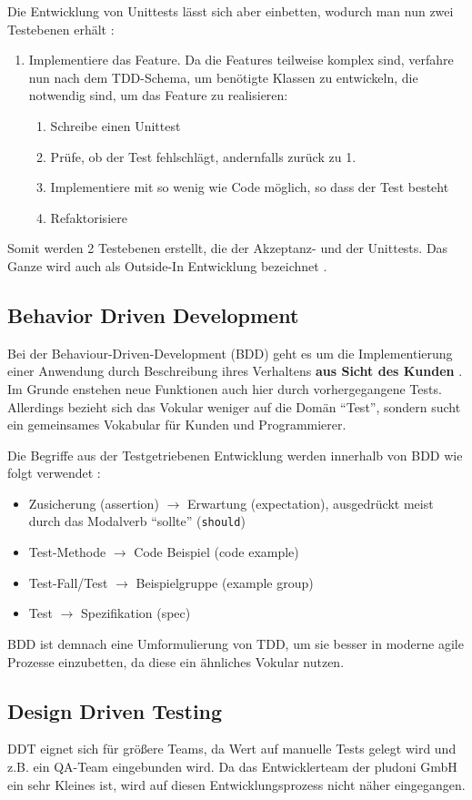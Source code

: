 Die Entwicklung von Unittests lässt sich aber einbetten, wodurch man nun zwei Testebenen erhält \citep[S. 285]{chelimsky_rspec_2010}:

\begin{enumerate}
 \item Implementiere das Feature. Da die Features teilweise komplex sind, verfahre nun nach dem TDD-Schema, um benötigte Klassen zu entwickeln, die notwendig sind, um das Feature zu realisieren:
  \begin{enumerate}
   \item Schreibe einen Unittest
   \item Prüfe, ob der Test fehlschlägt, andernfalls zurück zu 1.
   \item Implementiere mit so wenig wie Code möglich, so dass der Test besteht
   \item Refaktorisiere
  \end{enumerate}
\end{enumerate}

Somit werden 2 Testebenen erstellt, die der Akzeptanz- und der Unittests. Das Ganze wird auch als Outside-In Entwicklung bezeichnet \citep{chelimsky_rspec_2010}.

\subsection{Behavior Driven Development}
\label{sec:tddBdd}
Bei der Behaviour-Driven-Development (BDD) geht es um die Implementierung einer Anwendung durch Beschreibung ihres Verhaltens \textbf{aus Sicht des Kunden} \citep[S. 138]{chelimsky_rspec_2010}. Im Grunde enstehen neue Funktionen auch hier durch vorhergegangene Tests. Allerdings bezieht sich das Vokular weniger auf die Domän "`Test"', sondern sucht ein gemeinsames Vokabular für Kunden und Programmierer.

Die Begriffe aus der Testgetriebenen Entwicklung werden innerhalb von BDD wie folgt verwendet \citep[S. 151]{chelimsky_rspec_2010}:
\begin{itemize}
 \item Zusicherung (assertion) $\to$ Erwartung (expectation), ausgedrückt meist durch das Modalverb "`sollte"' (\texttt{should})
 \item Test-Methode $\to$ Code Beispiel (code example)
 \item Test-Fall/Test $\to$ Beispielgruppe (example group)
 \item Test $\to$ Spezifikation (spec)
\end{itemize}
BDD ist demnach eine Umformulierung von TDD, um sie besser in moderne agile Prozesse einzubetten, da diese ein ähnliches Vokular nutzen.

\subsection{Design Driven Testing}
DDT eignet sich für größere Teams, da Wert auf manuelle Tests gelegt wird und z.B. ein QA-Team eingebunden wird. Da das Entwicklerteam der pludoni GmbH ein sehr Kleines ist, wird auf diesen Entwicklungsprozess nicht näher eingegangen.
